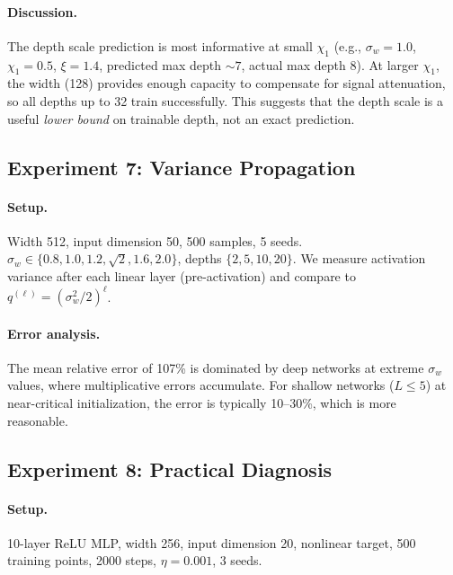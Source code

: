 \documentclass[10pt]{article}
\theoremstyle{definition}
\begin{document}
\paragraph{Discussion.}
The depth scale prediction is most informative at small $\chi_1$ (e.g., $\sigma_w = 1.0$, $\chi_1 = 0.5$, $\xi = 1.4$, predicted max depth $\sim 7$, actual max depth 8).
At larger $\chi_1$, the width (128) provides enough capacity to compensate for signal attenuation, so all depths up to 32 train successfully.
This suggests that the depth scale is a useful \emph{lower bound} on trainable depth, not an exact prediction.

\subsection{Experiment 7: Variance Propagation}

\paragraph{Setup.} Width 512, input dimension 50, 500 samples, 5 seeds.
$\sigma_w \in \{0.8, 1.0, 1.2, \sqrt{2}, 1.6, 2.0\}$, depths $\{2, 5, 10, 20\}$.
We measure activation variance after each linear layer (pre-activation) and compare to $q^{(\ell)} = (\sigma_w^2/2)^\ell$.

\paragraph{Error analysis.}
The mean relative error of 107\% is dominated by deep networks at extreme $\sigma_w$ values, where multiplicative errors accumulate.
For shallow networks ($L \leq 5$) at near-critical initialization, the error is typically 10--30\%, which is more reasonable.

\subsection{Experiment 8: Practical Diagnosis}

\paragraph{Setup.} 10-layer ReLU MLP, width 256, input dimension 20, nonlinear target, 500 training points, 2000 steps, $\eta = 0.001$, 3 seeds.
\end{document}
